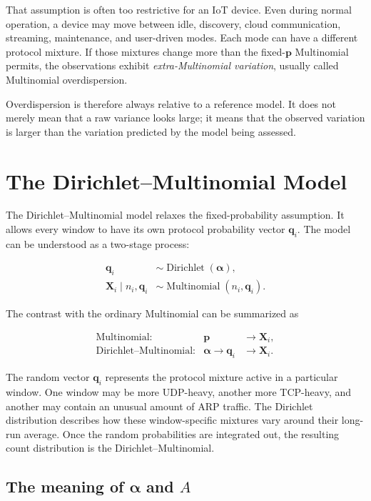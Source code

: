 \documentclass[11pt,a4paper]{article}
\begin{document}
That assumption is often too restrictive for an IoT device.  Even during
normal operation, a device may move between idle, discovery, cloud
communication, streaming, maintenance, and user-driven modes.  Each mode can
have a different protocol mixture.  If those mixtures change more than the
fixed-$\mathbf{p}$ Multinomial permits, the observations exhibit
\emph{extra-Multinomial variation}, usually called Multinomial
overdispersion.

Overdispersion is therefore always relative to a reference model.  It does not
merely mean that a raw variance looks large; it means that the observed
variation is larger than the variation predicted by the model being assessed.

\section{The Dirichlet--Multinomial Model}

The Dirichlet--Multinomial model relaxes the fixed-probability assumption.  It
allows every window to have its own protocol probability vector
$\mathbf{q}_i$.  The model can be understood as a two-stage process:

\begin{align}
\mathbf{q}_i
  &\sim \operatorname{Dirichlet}(\boldsymbol{\alpha}),\\
\mathbf{X}_i\mid n_i,\mathbf{q}_i
  &\sim \operatorname{Multinomial}(n_i,\mathbf{q}_i).
\end{align}

The contrast with the ordinary Multinomial can be summarized as

\[
\begin{array}{lll}
\text{Multinomial:}
  & \mathbf{p} & \longrightarrow \mathbf{X}_i,\\[0.4em]
\text{Dirichlet--Multinomial:}
  & \boldsymbol{\alpha} \longrightarrow \mathbf{q}_i
  & \longrightarrow \mathbf{X}_i.
\end{array}
\]

The random vector $\mathbf{q}_i$ represents the protocol mixture active in a
particular window.  One window may be more UDP-heavy, another more TCP-heavy,
and another may contain an unusual amount of ARP traffic.  The Dirichlet
distribution describes how these window-specific mixtures vary around their
long-run average.  Once the random probabilities are integrated out, the
resulting count distribution is the Dirichlet--Multinomial.

\subsection{The meaning of $\boldsymbol{\alpha}$ and $A$}
\end{document}
